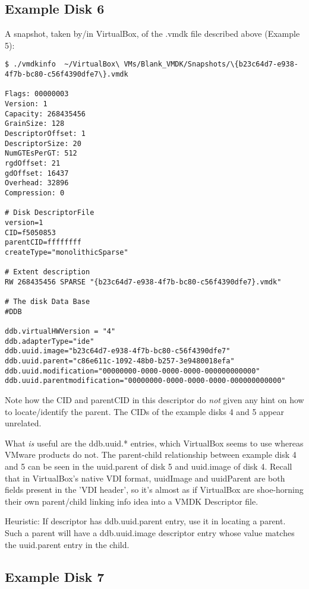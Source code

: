 \documentclass{article}
\begin{document}
\subsection{Example Disk 6}

A snapshot, taken by/in VirtualBox, of the .vmdk file described above
(Example 5):

\begin{verbatim}
$ ./vmdkinfo  ~/VirtualBox\ VMs/Blank_VMDK/Snapshots/\{b23c64d7-e938-4f7b-bc80-c56f4390dfe7\}.vmdk 

Flags: 00000003
Version: 1
Capacity: 268435456
GrainSize: 128
DescriptorOffset: 1
DescriptorSize: 20
NumGTEsPerGT: 512
rgdOffset: 21
gdOffset: 16437
Overhead: 32896
Compression: 0

# Disk DescriptorFile
version=1
CID=f5050853
parentCID=ffffffff
createType="monolithicSparse"

# Extent description
RW 268435456 SPARSE "{b23c64d7-e938-4f7b-bc80-c56f4390dfe7}.vmdk"

# The disk Data Base 
#DDB

ddb.virtualHWVersion = "4"
ddb.adapterType="ide"
ddb.uuid.image="b23c64d7-e938-4f7b-bc80-c56f4390dfe7"
ddb.uuid.parent="c86e611c-1092-48b0-b257-3e9480018efa"
ddb.uuid.modification="00000000-0000-0000-0000-000000000000"
ddb.uuid.parentmodification="00000000-0000-0000-0000-000000000000"
\end{verbatim}

Note how the CID and parentCID in this descriptor do {\em not} given
any hint on how to locate/identify the parent. The CIDs of the example
disks 4 and 5 appear unrelated.

What {\em is} useful are the ddb.uuid.* entries, which VirtualBox
seems to use whereas VMware products do not.  The parent-child
relationship between example disk 4 and 5 can be seen in the
uuid.parent of disk 5 and uuid.image of disk 4.  Recall that in
VirtualBox's native VDI format, uuidImage and uuidParent are both
fields present in the 'VDI header', so it's almost as if VirtualBox
are shoe-horning their own parent/child linking info idea into a VMDK
Descriptor file.


Heuristic: If descriptor has ddb.uuid.parent entry, use it in locating
a parent.  Such a parent will have a ddb.uuid.image descriptor entry
whose value matches the uuid.parent entry in the child.


\subsection{Example Disk 7}
\end{document}
